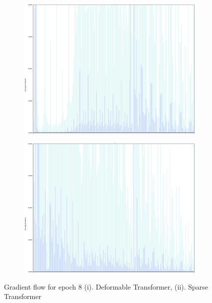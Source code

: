\begin{figure}[h]
	\centering
	\begin{subfigure}[b]{0.55\textwidth}
		\includegraphics[width=0.8\linewidth]{assets/img/deformable_grad_flow_epoch_8.png}
	\end{subfigure}%
	\begin{subfigure}[b]{0.55\textwidth}
		\includegraphics[width=0.8\linewidth]{assets/img/sparse_grad_flow_epoch_8.png}
	\end{subfigure}
	\caption{Gradient flow for epoch 8 (i). Deformable Transformer, (ii). Sparse Transformer}
	
	\label{fig:gradientflowepoch8}
\end{figure}





